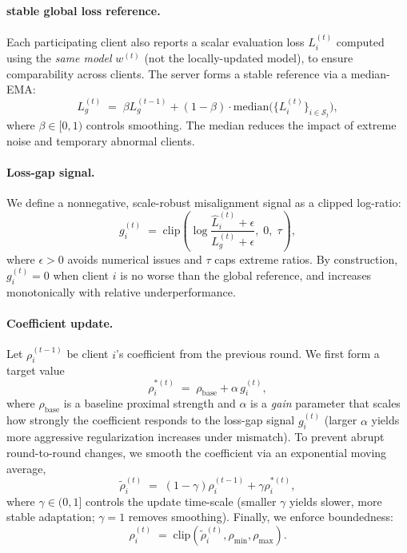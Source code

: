 \documentclass[letterpaper]{article} %
\begin{document}
\paragraph{stable global loss reference.}
Each participating client also reports a scalar evaluation loss $L_i^{(t)}$ computed using the \emph{same model} $w^{(t)}$ (not the locally-updated model), to ensure comparability across clients. The server forms a stable reference via a median-EMA:
\begin{equation}
\label{eq:global_loss}
L_g^{(t)} \;=\; \beta L_g^{(t-1)} + (1-\beta)\cdot \mathrm{median}\big(\{L_i^{(t)}\}_{i\in\mathcal{S}_t}\big),
\end{equation}
where $\beta\in[0,1)$ controls smoothing. The median reduces the impact of extreme noise and temporary abnormal clients.

\paragraph{Loss-gap signal.}
We define a nonnegative, scale-robust misalignment signal as a clipped log-ratio:
\begin{equation}
\label{eq:gap}
g_i^{(t)} \;=\; \mathrm{clip}\!\left(
\log\frac{\hat{L}_i^{(t)}+\epsilon}{L_g^{(t)}+\epsilon},\; 0,\; \tau
\right),
\end{equation}
where $\epsilon>0$ avoids numerical issues and $\tau$ caps extreme ratios. By construction, $g_i^{(t)}=0$ when client $i$ is no worse than the global reference, and increases monotonically with relative underperformance.

\paragraph{Coefficient update.}
Let $\rho_i^{(t-1)}$ be client $i$'s coefficient from the previous round. We first form a target value
\begin{equation}
\label{eq:target}
\rho_i^{\ast(t)} \;=\; \rho_{\mathrm{base}} + \alpha\, g_i^{(t)},
\end{equation}
where $\rho_{\mathrm{base}}$ is a baseline proximal strength and $\alpha$ is a \emph{gain} parameter that scales how strongly the coefficient responds to the loss-gap signal $g_i^{(t)}$ (larger $\alpha$ yields more aggressive regularization increases under mismatch). To prevent abrupt round-to-round changes, we smooth the coefficient via an exponential moving average,
\begin{equation}
\label{eq:smooth}
\tilde{\rho}_i^{(t)} \;=\; (1-\gamma)\rho_i^{(t-1)} + \gamma\rho_i^{\ast(t)},
\end{equation}
where $\gamma\in(0,1]$ controls the update time-scale (smaller $\gamma$ yields slower, more stable adaptation; $\gamma=1$ removes smoothing). Finally, we enforce boundedness:
\begin{equation}
\label{eq:clip}
\rho_i^{(t)} \;=\; \mathrm{clip}(\tilde{\rho}_i^{(t)},\rho_{\min},\rho_{\max}).
\end{equation}
\end{document}
